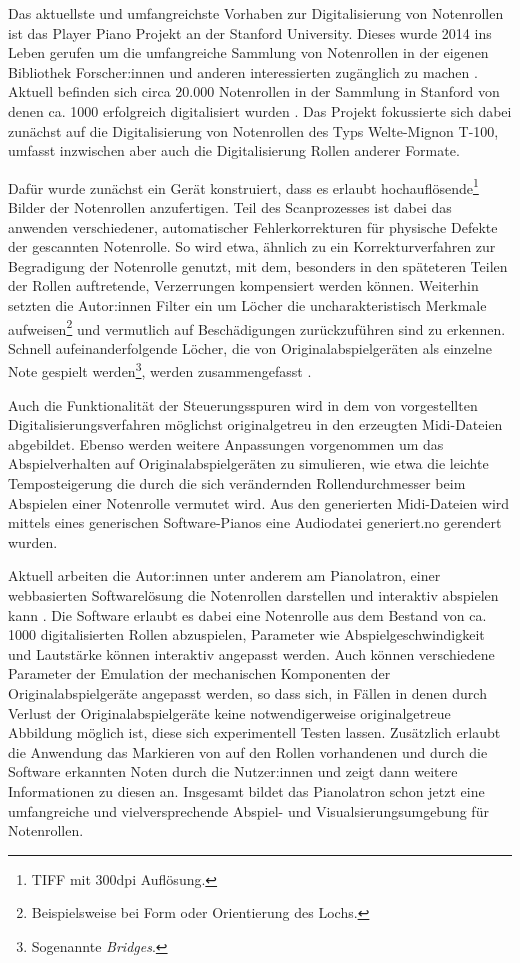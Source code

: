 Das aktuellste und umfangreichste Vorhaben zur Digitalisierung von Notenrollen ist das Player Piano Projekt an der Stanford University.
Dieses wurde 2014 ins Leben gerufen um die umfangreiche Sammlung von Notenrollen in der eigenen Bibliothek Forscher:innen und anderen interessierten zugänglich zu machen \autocite[]{shi_2019}.
Aktuell befinden sich circa 20.000 Notenrollen in der Sammlung in Stanford von denen ca. 1000 erfolgreich digitalisiert wurden \autocite[]{broadwell_2022}.
Das Projekt fokussierte sich dabei zunächst auf die Digitalisierung von Notenrollen des Typs Welte-Mignon T-100, umfasst inzwischen aber auch die Digitalisierung Rollen anderer Formate.

Dafür wurde zunächst ein Gerät konstruiert, dass es erlaubt hochauflösende\footnote{TIFF mit 300dpi Auflösung.} Bilder der Notenrollen anzufertigen.
Teil des Scanprozesses ist dabei das anwenden verschiedener, automatischer Fehlerkorrekturen für physische Defekte der gescannten Notenrolle.
So wird etwa, ähnlich zu \textcite[]{zoltan_1994} ein Korrekturverfahren zur Begradigung der Notenrolle genutzt, mit dem, besonders in den späteteren Teilen der Rollen auftretende, Verzerrungen kompensiert werden können.
Weiterhin setzten die Autor:innen Filter ein um Löcher die uncharakteristisch Merkmale aufweisen\footnote{Beispielsweise bei Form oder Orientierung des Lochs.} und vermutlich auf Beschädigungen zurückzuführen sind zu erkennen.
Schnell aufeinanderfolgende Löcher, die von Originalabspielgeräten als einzelne Note gespielt werden\footnote{Sogenannte \textit{Bridges}.}, werden zusammengefasst \autocite[519-520]{shi_2019}.

Auch die Funktionalität der Steuerungsspuren wird in dem von \textcite[521-522]{shi_2019} vorgestellten Digitalisierungsverfahren möglichst originalgetreu in den erzeugten Midi-Dateien abgebildet.
Ebenso werden weitere Anpassungen vorgenommen um das Abspielverhalten auf Originalabspielgeräten zu simulieren, wie etwa die leichte Temposteigerung die durch die sich verändernden Rollendurchmesser beim Abspielen einer Notenrolle vermutet wird.
Aus den generierten Midi-Dateien wird mittels eines generischen Software-Pianos eine Audiodatei generiert.no gerendert wurden.

Aktuell arbeiten die Autor:innen unter anderem am Pianolatron, einer webbasierten Softwarelösung die Notenrollen darstellen und interaktiv abspielen kann \parencite[]{vijoy_2022}.
Die Software erlaubt es dabei eine Notenrolle aus dem Bestand von ca. 1000 digitalisierten Rollen abzuspielen, Parameter wie Abspielgeschwindigkeit und Lautstärke können interaktiv angepasst werden.
Auch können verschiedene Parameter der Emulation der mechanischen Komponenten der Originalabspielgeräte angepasst werden, so dass sich, in Fällen in denen durch Verlust der Originalabspielgeräte keine notwendigerweise originalgetreue Abbildung möglich ist, diese sich experimentell Testen lassen.
Zusätzlich erlaubt die Anwendung das Markieren von auf den Rollen vorhandenen und durch die Software erkannten Noten durch die Nutzer:innen und zeigt dann weitere Informationen zu diesen an.
Insgesamt bildet das Pianolatron schon jetzt eine umfangreiche und vielversprechende Abspiel- und Visualsierungsumgebung für Notenrollen.

